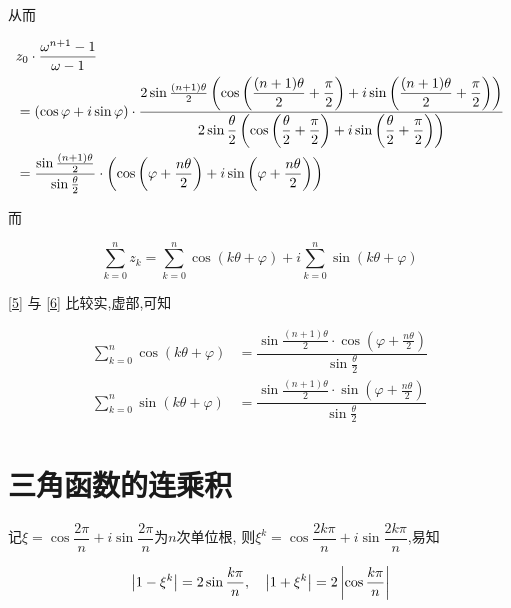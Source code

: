 \documentclass{article}
\begin{document}
从而

\begin{align}
    & z_0 \cdot \dfrac{\omega^{n + 1} - 1}{\omega - 1} \notag \\
    & = (\cos \varphi + i \sin \varphi) \cdot \dfrac{2 \sin \frac{(n + 1) \theta}{2}
        \left( \cos \left( \dfrac{(n + 1) \theta}{2} + \dfrac{\pi}{2} \right) + i \sin \left( \dfrac{(n + 1) \theta}{2}
        + \dfrac{\pi}{2} \right) \right)}{2 \sin \dfrac{\theta}{2}\left( \cos \left( \dfrac{\theta}{2} + \dfrac{\pi}{2} \right)
        + i \sin \left( \dfrac{\theta}{2} + \dfrac{\pi}{2} \right) \right)} \notag \\
    & = \dfrac{\sin \frac{(n + 1) \theta}{2}}{\sin \frac{\theta}{2}} \cdot \left( \cos \left( \varphi +
        \dfrac{n \theta}{2} \right) + i \sin \left( \varphi + \dfrac{n \theta}{2} \right) \right) \label{5}
\end{align}

而

\begin{equation}
    \sum\limits_{k = 0}^n z_k = \sum\limits_{k = 0}^n \cos (k \theta + \varphi) +
    i \sum\limits_{k = 0}^n \sin (k \theta + \varphi) \label{6}
\end{equation}

\eqref{5} 与 \eqref{6} 比较实,虚部,可知

\begin{align*}
    \sum_{k = 0}^n \cos (k \theta + \varphi) & = \dfrac{\sin \frac{(n + 1) \theta}{2} \cdot
        \cos \left( \varphi + \frac{n \theta}{2} \right)}{\sin \frac{\theta}{2}} \\
    \sum_{k = 0}^n \sin (k \theta + \varphi) & = \dfrac{\sin \frac{(n + 1) \theta}{2} \cdot
        \sin \left( \varphi + \frac{n \theta}{2} \right)}{\sin \frac{\theta}{2}}
\end{align*}

\section{三角函数的连乘积}

记$\xi = \cos \dfrac{2 \pi}{n} + i \sin \dfrac{2 \pi}{n}$为$n$次单位根,
则$\xi^k = \cos \dfrac{2k \pi}{n} + i \sin \dfrac{2k \pi}{n}$,易知

\begin{equation*}
    \left\lvert 1 - \xi^k \right\rvert = 2 \sin \dfrac{k \pi}{n}, \quad
    \left\lvert 1 + \xi^k \right\rvert = 2 \left\lvert \cos \dfrac{k \pi}{n} \right\rvert
\end{equation*}
\end{document}
